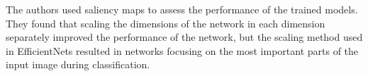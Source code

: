 The authors used saliency maps to assess the performance of the trained models. They found that scaling the dimensions of the network in each dimension separately improved the performance of the network, but the scaling method used in EfficientNets resulted in networks focusing on the most important parts of the input image during classification.